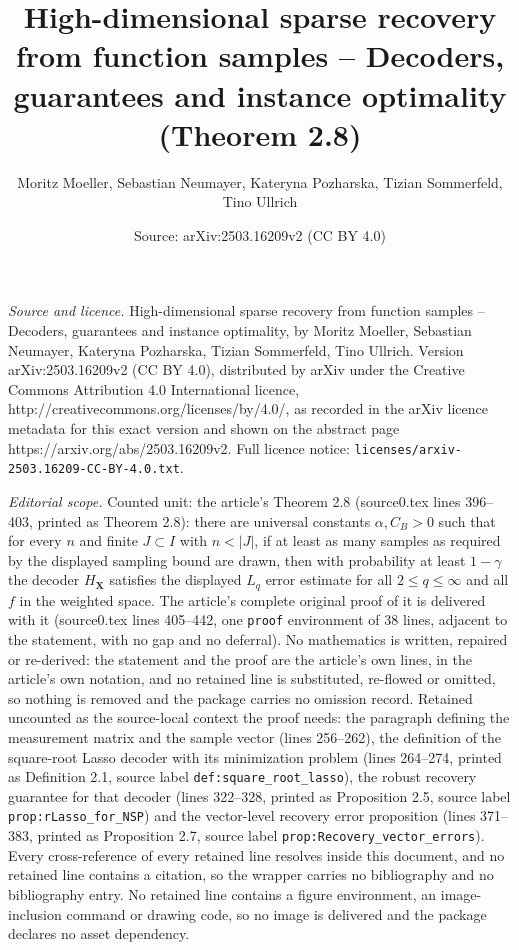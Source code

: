 \documentclass[10pt,a4paper]{amsart}
\title[Theorem 2.8]{High-dimensional sparse recovery from function samples -- Decoders, guarantees and instance optimality (Theorem 2.8)}
\author{Moritz Moeller, Sebastian Neumayer, Kateryna Pozharska, Tizian Sommerfeld, Tino Ullrich}
\date{Source: arXiv:2503.16209v2 (CC BY 4.0)}
\begin{document}
\maketitle

\noindent\emph{Source and licence.} High-dimensional sparse recovery from function samples -- Decoders, guarantees and instance optimality, by Moritz Moeller, Sebastian Neumayer, Kateryna Pozharska, Tizian Sommerfeld, Tino Ullrich. Version arXiv:2503.16209v2
(CC BY 4.0), distributed by arXiv under the Creative Commons Attribution 4.0 International licence,
http://creativecommons.org/licenses/by/4.0/, as recorded in the arXiv licence metadata for this exact
version and shown on the abstract page https://arxiv.org/abs/2503.16209v2. Full licence notice:
\texttt{licenses/arxiv-2503.16209-CC-BY-4.0.txt}.\par\smallskip

\noindent\textit{Editorial scope.} Counted unit: the article's Theorem 2.8 (source0.tex lines 396--403, printed as Theorem 2.8): there are universal constants $\alpha,C_B>0$ such that for every $n$ and finite $J\subset I$ with $n<\lvert J\rvert$, if at least as many samples as required by the displayed sampling bound are drawn, then with probability at least $1-\gamma$ the decoder $H_{\mathbf{X}}$ satisfies the displayed $L_q$ error estimate for all $2\le q\le\infty$ and all $f$ in the weighted space. The article's complete original proof of it is delivered with it (source0.tex lines 405--442, one \texttt{proof} environment of 38 lines, adjacent to the statement, with no gap and no deferral). No mathematics is written, repaired or re-derived: the statement and the proof are the article's own lines, in the article's own notation, and no retained line is substituted, re-flowed or omitted, so nothing is removed and the package carries no omission record. Retained uncounted as the source-local context the proof needs: the paragraph defining the measurement matrix and the sample vector (lines 256--262), the definition of the square-root Lasso decoder with its minimization problem (lines 264--274, printed as Definition 2.1, source label \texttt{def:square\_root\_lasso}), the robust recovery guarantee for that decoder (lines 322--328, printed as Proposition 2.5, source label \texttt{prop:rLasso\_for\_NSP}) and the vector-level recovery error proposition (lines 371--383, printed as Proposition 2.7, source label \texttt{prop:Recovery\_vector\_errors}). Every cross-reference of every retained line resolves inside this document, and no retained line contains a citation, so the wrapper carries no bibliography and no bibliography entry. No retained line contains a figure environment, an image-inclusion command or drawing code, so no image is delivered and the package declares no asset dependency.
\end{document}
